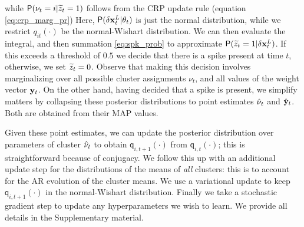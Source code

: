 while $\mathsf{P}({\nu_t} = i | \widetilde{z}_t = 1)$ follows from the CRP update rule (equation \eqref{eq:crp_marg_pr})
Here,  $\mathsf{P}(\delta{\mathbf{x}}^L_t | \theta_t)$ is just the normal distribution, while we restrict $q_{it}(\cdot)$ be the 
normal-Wishart distribution. %
We can then evaluate the integral, and then summation \eqref{eq:spk_prob} to approximate $\mathsf{P}(\widetilde{z}_t = 1 | \delta{\mathbf{x}}^L_t)$. 
If this exceeds a threshold of $0.5$ we decide that there is a spike present at time $t$, otherwise, we set $\widetilde{z}_t = 0$.
Observe that making this decision involves marginalizing over all possible cluster assignments $\nu_t$, and all values of the weight vector $\mathbf{y}_t$.
On the other hand, having decided that a spike is present, we simplify matters by collapsing these posterior distributions to point estimates 
$\hat{\nu}_t$ and $\hat{\mathbf{y}}_t$. Both are obtained from their MAP values. 

Given these point estimates, we can update the posterior distribution over parameters of cluster $\hat{\nu}_t$ to obtain $\mathsf{q}_{i,t+1}(\cdot)$ from 
$\mathsf{q}_{i,t}(\cdot)$; this is straightforward because of conjugacy. We follow this up with an additional update step for the distributions of the means of
\emph{all} clusters: this is to account for the AR evolution of the cluster means. 
We use a variational update to keep  $\mathsf{q}_{i,t+1}(\cdot)$ in the normal-Wishart distribution. Finally we take a stochastic gradient step to
update any hyperparameters we wish to learn. We provide all details in the Supplementary material.



